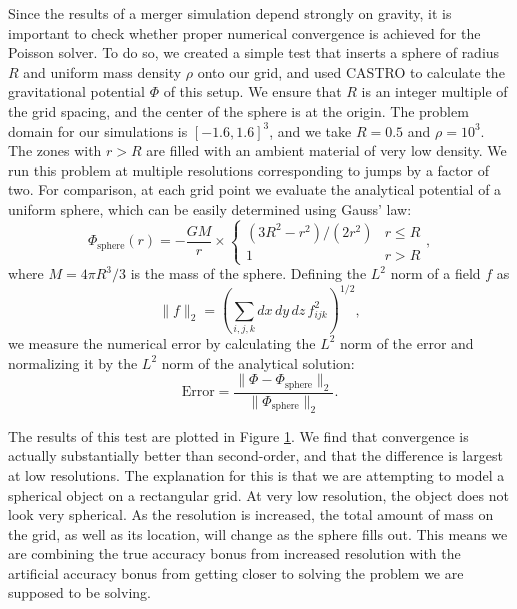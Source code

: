 \documentclass{emulateapj}
\begin{document}
Since the results of a merger simulation depend strongly on gravity,
it is important to check whether proper numerical convergence is
achieved for the Poisson solver. To do so, we created a simple test
that inserts a sphere of radius $R$ and uniform mass density $\rho$
onto our grid, and used CASTRO to calculate the gravitational
potential $\Phi$ of this setup. We ensure that $R$ is an integer
multiple of the grid spacing, and the center of the sphere is at the
origin. The problem domain for our simulations is $[-1.6, 1.6]^3$, and
we take $R = 0.5$ and $\rho = 10^3$. The zones with $r > R$ are filled
with an ambient material of very low density. We run this problem at
multiple resolutions corresponding to jumps by a factor of two. For
comparison, at each grid point we evaluate the analytical potential of
a uniform sphere, which can be easily determined using Gauss' law:
\begin{equation}
  \Phi_{\text{sphere}}(r) = -\frac{GM}{r} \times \begin{cases} (3R^2 - r^2)/(2 r^2) & r \leq R \\ 1 & r > R \end{cases},\label{eq:sphere-analytical}
\end{equation}
where $M = 4\pi R^3 / 3$ is the mass of the sphere. Defining the $L^2$
norm of a field $f$ as
\begin{equation}
  \| f \|_2 = \left(\sum_{i,j,k} dx\, dy\, dz\, f_{ijk}^2\right)^{1/2},
\end{equation}
we measure the numerical error by calculating the $L^2$ norm of the error and normalizing it by the $L^2$ norm of the analytical solution:
\begin{equation}
  \text{Error} = \frac{\|\Phi - \Phi_{\text{sphere}}\|_2}{\|\Phi_{\text{sphere}}\|_2}.
\end{equation}

\begin{figure}
  \label{fig:gravity_convergence}
\end{figure}

The results of this test are plotted in Figure
\ref{fig:gravity_convergence}. We find that convergence is actually
substantially better than second-order, and that the difference is
largest at low resolutions. The explanation for this is that we are
attempting to model a spherical object on a rectangular grid. At very
low resolution, the object does not look very spherical. As the
resolution is increased, the total amount of mass on the grid, as well
as its location, will change as the sphere fills out. This means we
are combining the true accuracy bonus from increased resolution with
the artificial accuracy bonus from getting closer to solving the
problem we are supposed to be solving.
\end{document}
